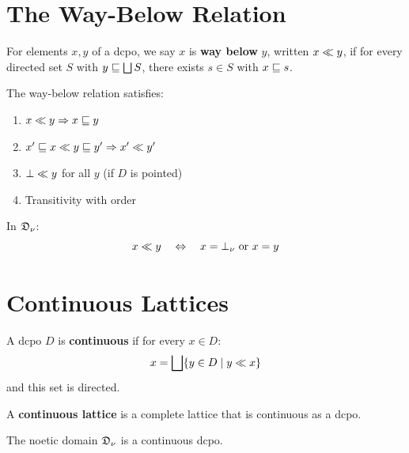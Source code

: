 \section{The Way-Below Relation}

\begin{definition}
\label{def:way-below}
For elements $x, y$ of a dcpo, we say $x$ is \textbf{way below} $y$, written
$x \ll y$, if for every directed set $S$ with $y \sqsubseteq \bigsqcup S$,
there exists $s \in S$ with $x \sqsubseteq s$.
\end{definition}

\begin{lemma}
\label{lem:way-below-props}
The way-below relation satisfies:
\begin{enumerate}[label=(\roman*)]
  \item $x \ll y \Rightarrow x \sqsubseteq y$
  \item $x' \sqsubseteq x \ll y \sqsubseteq y' \Rightarrow x' \ll y'$
  \item $\bot \ll y$ for all $y$ (if $D$ is pointed)
  \item Transitivity with order
\end{enumerate}
\end{lemma}

\begin{proposition}
\label{prop:way-below-flat}
In $\mathfrak{D}_\nu$:
\[
x \ll y \quad \Leftrightarrow \quad x = \bot_\nu \text{ or } x = y
\]
\end{proposition}

\section{Continuous Lattices}

\begin{definition}
\label{def:continuous-dcpo}
A dcpo $D$ is \textbf{continuous} if for every $x \in D$:
\[
x = \bigsqcup \{y \in D \mid y \ll x\}
\]
and this set is directed.
\end{definition}

\begin{definition}
\label{def:continuous-lattice}
A \textbf{continuous lattice} is a complete lattice that is continuous as a dcpo.
\end{definition}

\begin{theorem}
\label{thm:noetic-continuous}
The noetic domain $\mathfrak{D}_\nu$ is a continuous dcpo.
\end{theorem}

